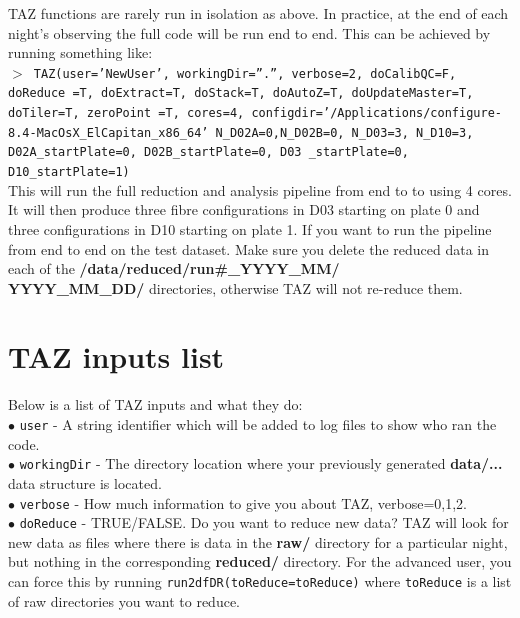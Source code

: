 \documentclass[12pt]{article}
\begin{document}
 TAZ functions are rarely run in isolation as above. In practice, at the end of each night's observing the full code will be run end to end. This can be achieved by running something like: \\
 
  \hspace{10mm} \texttt{$>$  TAZ(user='NewUser', workingDir=''.'', verbose=2,  doCalibQC=F, doReduce =T, doExtract=T, doStack=T,  doAutoZ=T,  doUpdateMaster=T, doTiler=T, zeroPoint =T, cores=4, configdir='/Applications/configure-8.4-MacOsX\_ElCapitan\_x86\_64' N\_D02A=0,N\_D02B=0, N\_D03=3, N\_D10=3, D02A\_startPlate=0, D02B\_startPlate=0, D03 \_startPlate=0, D10\_startPlate=1)}\\

This will run the full reduction and analysis pipeline from end to to using 4 cores. It will then produce three fibre configurations in D03 starting on plate 0 and three configurations in D10 starting on plate 1. If you want to run the pipeline from end to end on the test dataset. Make sure you delete the reduced data in each of the  \textbf{/data/reduced/run\#\_YYYY\_MM/ \\ YYYY\_MM\_DD/} directories, otherwise TAZ will not re-reduce them. 

\section{TAZ inputs list}

Below is a list of TAZ inputs and what they do:\\


$\bullet$ \texttt{user} - A string identifier which will be added to log files to show who ran the code. \\

$\bullet$ \texttt{workingDir} - The directory location where your previously generated \textbf{data/...} data structure is located.\\

$\bullet$ \texttt{verbose} - How much information to give you about TAZ,  verbose=0,1,2.\\

$\bullet$ \texttt{doReduce} - TRUE/FALSE. Do you want to reduce new data? TAZ will look for new data as files where there is data in the \textbf{raw/} directory for a particular night, but nothing in the corresponding \textbf{reduced/} directory. For the advanced user, you can force this by running \texttt{run2dfDR(toReduce=toReduce)} where \texttt{toReduce} is a list of raw directories you want to reduce. \\
\end{document}
